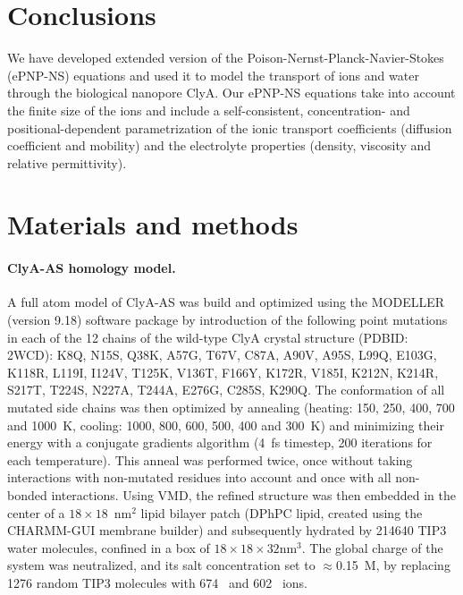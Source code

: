 \documentclass[journal=ancac3,manuscript=article,etalmode=truncate,maxauthors=0,layout=twocolumn]{achemso}
\begin{document}
\section{Conclusions}\label{sect:conclusions}
We have developed extended version of the Poison-Nernst-Planck-Navier-Stokes (ePNP-NS) equations and used it
to model the transport of ions and water through the biological nanopore ClyA. Our ePNP-NS equations take
into account the finite size of the ions and include a self-consistent, concentration- and
positional-dependent parametrization of the ionic transport coefficients (diffusion coefficient and mobility)
and the electrolyte properties (density, viscosity and relative permittivity).




\section{Materials and methods}

\paragraph{ClyA-AS homology model.}
A full atom model of ClyA-AS\cite{Soskine-2013} was build and optimized using the MODELLER (version 9.18)
software package by introduction of the following point mutations in each of the 12 chains of the wild-type
ClyA crystal structure (PDBID: 2WCD\cite{Mueller-2009}):
K8Q, N15S, Q38K, A57G, T67V, C87A, A90V, A95S, L99Q, E103G, K118R, L119I, I124V, T125K, V136T, F166Y, K172R,
V185I, K212N, K214R, S217T, T224S, N227A, T244A, E276G, C285S, K290Q.
The conformation of all mutated side chains was then optimized by annealing (heating: 150, 250, 400, 700 and
1000~K, cooling: 1000, 800, 600, 500, 400 and 300~K) and minimizing their energy with a conjugate gradients
algorithm (4~fs timestep, 200 iterations for each temperature).\cite{Shanno-1980} This anneal was performed
twice, once without taking interactions with non-mutated residues into account and once with all non-bonded
interactions.\cite{Sali-1993} Using VMD,\cite{Humphrey-1996} the refined structure was then embedded in the
center of a $18\times18$~nm$^2$ lipid bilayer patch (DPhPC lipid, created using the CHARMM-GUI membrane
builder\cite{Lee-2016}) and subsequently hydrated by 214640 TIP3 water molecules, confined in a box of
$18\times18\times32\text{nm}^3$. The global charge of the system was neutralized, and its salt concentration
set to $\approx$0.15~M, by replacing 1276 random TIP3 molecules with 674 \Na\ and 602 \Cl\
ions.\cite{Aksimentiev-2005}
\end{document}
